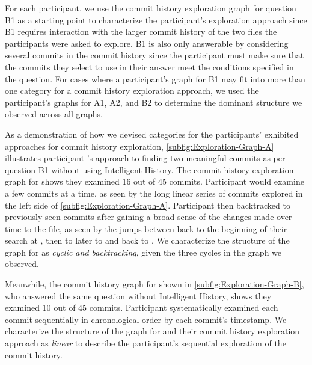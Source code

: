 For each participant, we use the commit history exploration graph for question B1
as a starting point to characterize the participant's exploration approach since
B1 requires interaction with the larger commit history of the two files the participants were asked to explore.
B1 is also only answerable by considering several commits in the commit history since the
participant must make sure that the commits they select to use in their answer meet the conditions specified in the question.
For cases where a participant's graph for B1 may fit into more than one category for a commit history exploration approach,
we used the participant's graphs for A1, A2, and B2 to determine the dominant structure we observed across all graphs.

As a demonstration of how we devised categories for the participants' exhibited approaches for commit history exploration, 
\autoref{subfig:Exploration-Graph-A} illustrates participant 's approach to finding 
two meaningful commits as per question B1 without using Intelligent History.
The commit history exploration graph for  shows they examined 16 out of 45 commits.
Participant  would examine a few commits at a time,
as seen by the long linear series of commits explored in the left side of \autoref{subfig:Exploration-Graph-A}.
Participant  then backtracked to previously seen commits 
after gaining a broad sense of the changes made over time to the file,
as seen by the jumps between  back to the beginning of their search at , 
then to later to  and back to .
We characterize the structure of the graph for  as \textit{cyclic and backtracking},
given the three cycles in the graph we observed.

Meanwhile, the commit history graph for  shown in \autoref{subfig:Exploration-Graph-B}, 
who answered the same question without Intelligent History, shows they examined 10 out of 45 commits.
Participant  systematically examined 
each commit sequentially in chronological order by each commit's timestamp.
We characterize the structure of the graph for  and their commit history exploration approach as \textit{linear} 
to describe the participant's sequential exploration of the commit history.

